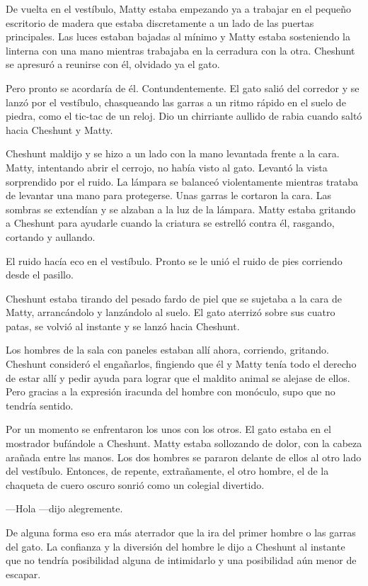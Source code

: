 {De vuelta en el vestíbulo, Matty estaba empezando ya a trabajar en el
	pequeño escritorio de madera que estaba discretamente a un lado de las
	puertas principales. Las luces estaban bajadas al mínimo y Matty estaba
	sosteniendo la linterna con una mano mientras trabajaba en la cerradura
	con la otra. Cheshunt se apresuró a reunirse con él, olvidado ya el
gato.}

{Pero pronto se acordaría de él. Contundentemente. El gato salió del
	corredor y se lanzó por el vestíbulo, chasqueando las garras a un ritmo
	rápido en el suelo de piedra, como el tic-tac de un reloj. Dio un
chirriante aullido de rabia cuando saltó hacia Cheshunt y Matty.}

{Cheshunt maldijo y se hizo a un lado con la mano levantada frente a la
	cara. Matty, intentando abrir el cerrojo, no había visto al gato.
	Levantó la vista sorprendido por el ruido. La lámpara se balanceó
	violentamente mientras trataba de levantar una mano para protegerse.
	Unas garras le cortaron la cara. Las sombras se extendían y se alzaban a
	la luz de la lámpara. Matty estaba gritando a Cheshunt para ayudarle
	cuando la criatura se estrelló contra él, rasgando, cortando y
aullando.}

{El ruido hacía eco en el vestíbulo. Pronto se le unió el ruido de pies
corriendo desde el pasillo.}

{Cheshunt estaba tirando del pesado fardo de piel que se sujetaba a la
	cara de Matty, arrancándolo y lanzándolo al suelo. El gato aterrizó
	sobre sus cuatro patas, se volvió al instante y se lanzó hacia
Cheshunt.}

{Los hombres de la sala con paneles estaban allí ahora, corriendo,
	gritando. Cheshunt consideró el engañarlos, fingiendo que él y Matty
	tenía todo el derecho de estar allí y pedir ayuda para lograr que el
	maldito animal se alejase de ellos. Pero gracias a la expresión iracunda
del hombre con monóculo, supo que no tendría sentido.}

{Por un momento se enfrentaron los unos con los otros. El gato estaba en
	el mostrador bufándole a Cheshunt. Matty estaba sollozando de dolor, con
	la cabeza arañada entre las manos. Los dos hombres se pararon delante de
	ellos al otro lado del vestíbulo. Entonces, de repente, extrañamente, el
	otro hombre, el de la chaqueta de cuero oscuro sonrió como un colegial
divertido.}

{---Hola ---dijo alegremente.}

{De alguna forma eso era más aterrador que la ira del primer hombre o
	las garras del gato. La confianza y la diversión del hombre le dijo a
	Cheshunt al instante que no tendría posibilidad alguna de intimidarlo y
una posibilidad aún menor de escapar.}

